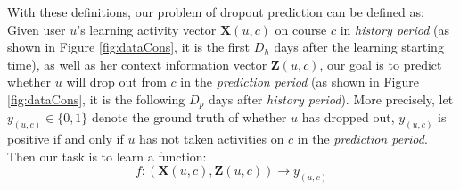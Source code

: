 

With these definitions, our problem of dropout prediction can be defined as: Given user $u$'s learning activity vector $\mathbf{X}(u,c)$ on course $c$ in \textit{history period} (as shown in Figure \ref{fig:dataCons}, it is the first $D_h$ days after the learning starting time), as well as her context information vector $\mathbf{Z}(u,c)$, our goal is to predict whether $u$ will drop out from $c$ in the \textit{prediction period} (as shown in Figure \ref{fig:dataCons}, it is the following $D_p$ days after \textit{history period}). More precisely, let $y_{(u,c)} \in \{0,1\}$ denote the ground truth of whether $u$ has dropped out, $y_{(u,c)}$ is positive if and only if $u$ has not taken activities on $c$ in the \textit{prediction period}. Then our task is to learn a function:
$$f: (\mathbf{X}(u,c), \mathbf{Z}(u,c))\to y_{(u,c)}$$ \\


